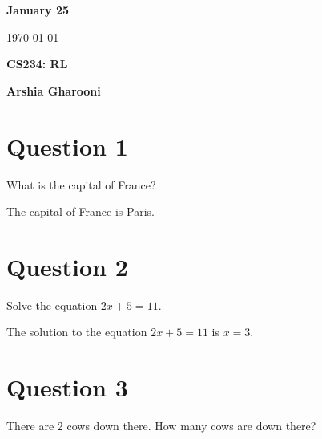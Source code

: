 \documentclass{article}
\begin{document}
{{{\begin{minipage}{0.3\textwidth}
        \textcolor{titletext}{\Large\textbf{January 25}}\par
        \vspace{4cm}
        \textcolor{titletext}{\today}
      \end{minipage}%
    }%
    \hspace{0.05\textwidth} %
    \colorbox{leftcol}{%
      \begin{minipage}{0.6\textwidth}
      \centering
        \vspace*{2cm}
        \textcolor{titletext}{\Huge\textbf{CS234: RL}}\par
        \vspace{1cm}
        \textcolor{titletext}{\Large\textbf{Arshia Gharooni}}
        \vspace{30cm}
      \end{minipage}%
    }%
  }
}

\begin{titlepage}
  \centering
  \vspace*{2cm}
  \textcolor{blacktitle}{}\par
  \vspace{0.5cm}
  \textcolor{blacktitle}{}
\end{titlepage}

\ClearShipoutPictureBG

\section*{Question 1}
\begin{questionbox}
What is the capital of France?
\end{questionbox}

\begin{solutionbox}
  The capital of France is Paris.
\end{solutionbox}

\section*{Question 2}
\begin{questionbox}
Solve the equation $2x + 5 = 11$.
\end{questionbox}

\begin{solutionbox}
  The solution to the equation $2x + 5 = 11$ is $x = 3$.
\end{solutionbox}

\section*{Question 3}
\begin{questionbox}
There are 2 cows down there. How many cows are down there?
\end{questionbox}
\end{document}
